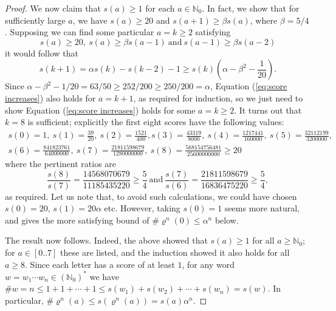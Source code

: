 \documentclass[11pt]{amsart}
\numberwithin{equation}{section}
\theoremstyle{plain}
\theoremstyle{definition}
\newcommand{\N}{{\mathbb N}}
\newcommand{\sub}{\varrho}
\begin{document}
\begin{proof}
We now claim that \(s(a) \geq 1\) for each \(a \in \N_0\). In fact, we show that for sufficiently large \(a\), we have \(s(a) \geq 20\) and \(s(a+1) \geq \beta s(a)\), where \(\beta = 5/4\). Supposing we can find some particular \(a = k \geq 2\) satisfying
\begin{equation} \label{eq:score increases}
s(a) \geq 20, \ s(a) \geq \beta s(a-1) \ \text{and} \ s(a-1) \geq \beta s(a-2) 
\end{equation}
it would follow that
\[
s(k+1) = \alpha s(k) - s(k-2) - 1 \geq s(k) \left( \alpha - \beta^2 - \frac{1}{20} \right) .
\]
Since \(\alpha - \beta^2 - 1/20 = 63/50 \geq 252/200 \geq 250/200 = \alpha\), Equation (\ref{eq:score increases}) also holds for \(a = k+1\), as required for induction, so we just need to show Equation (\ref{eq:score increases}) holds for some \(a = k \geq 2\). It turns out that \(k = 8\) is sufficient; explicitly the first eight scores have the following values:
\begin{align*}
s(0) = 1 , \ s(1) = \frac{39}{20} , \ s(2) = \frac{1521}{400} , s(3) = \frac{43319}{8000} , \ s(4) = \frac{1217441}{160000} , \ s(5) = \frac{32112199}{3200000} , \\ 
s(6) = \frac{841823761}{64000000} , \ s(7) = \frac{21811598679}{1280000000} , \ s(8) = \frac{568154756481}{25600000000} \geq 20 
\end{align*}
where the pertinent ratios are
\[
\frac{s(8)}{s(7)} = \frac{14568070679}{11185435220} \geq \frac{5}{4} \ \text{and} \ \frac{s(7)}{s(6)} = \frac{21811598679}{16836475220} \geq \frac{5}{4} ,
\]
as required. Let us note that, to avoid such calculations, we could have chosen \(s(0) = 20\), \(s(1) = 20\alpha\) etc. However, taking \(s(0) = 1\) seems more natural, and gives the more satisfying bound of \(\# \sub^n(0) \leq \alpha^n\) below.

The result now follows. Indeed, the above showed that \(s(a) \geq 1\) for all \(a \geq \N_0\); for \(a \in [0..7]\) these are listed, and the induction showed it also holds for all \(a \geq 8\). Since each letter has a score of at least \(1\), for any word \(w = w_1 \cdots w_n \in (\N_0)^\ast\) we have \(\# w = n \leq 1 + 1 + \cdots + 1 \leq s(w_1) + s(w_2) + \cdots + s(w_n) = s(w)\). In particular, \( \# \sub^n(a) \leq s(\sub^n(a)) = s(a) \alpha^n \).
\end{proof}
\end{document}
